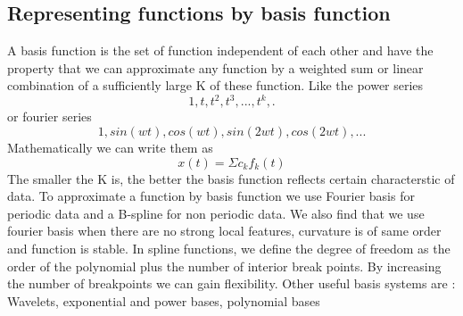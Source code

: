 \documentclass{article}
\begin{document}
\subsection{Representing functions by basis function}
A basis function is the set of function independent of each other and have the property that we can approximate any function by a weighted sum or linear combination of a sufficiently large K of these function. Like the power series \[1, t, t^2 , t^3 , . . . , t^k , .  \] or fourier series \[1, sin(wt), cos(wt), sin(2wt), cos(2wt),...\] Mathematically we can write them as 
\[x(t) = \Sigma c_k f_k (t)\]
The smaller the K is, the better the basis function reflects certain characterstic of data.\newline
To approximate a function by basis function we use Fourier basis for periodic data and a B-spline for non periodic data. We also find that we use fourier basis when there are no strong local features, curvature is of same order and function is stable.
\newline
In spline functions,  we define the degree of freedom as the order of the polynomial plus the number of interior break points.
By increasing the number of breakpoints we can gain flexibility. Other useful basis systems are : \newline
Wavelets, exponential and power bases, polynomial bases




\end{document}
